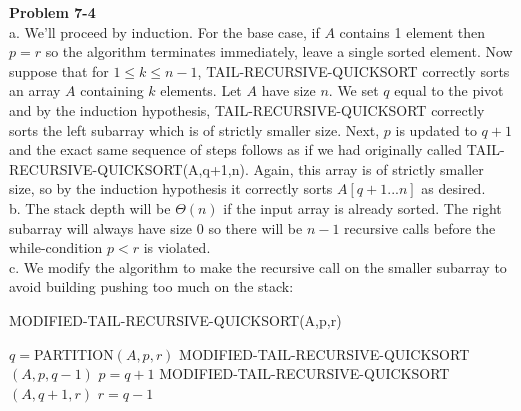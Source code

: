 \documentclass{article}
\begin{document}
\noindent\textbf{Problem 7-4}\\

a. We'll proceed by induction.  For the base case, if $A$ contains 1 element then $p = r$ so the algorithm terminates immediately, leave a single sorted element.  Now suppose that for $1 \leq k \leq n-1$, TAIL-RECURSIVE-QUICKSORT correctly sorts an array $A$ containing $k$ elements. Let $A$ have size $n$.  We set $q$ equal to the pivot and by the induction hypothesis, TAIL-RECURSIVE-QUICKSORT correctly sorts the left subarray which is of strictly smaller size.  Next, $p$ is updated to $q+1$ and the exact same sequence of steps follows as if we had originally called TAIL-RECURSIVE-QUICKSORT(A,q+1,n).  Again, this array is of strictly smaller size, so by the induction hypothesis it correctly sorts $A[q+1...n]$ as desired. \\

b. The stack depth will be $\Theta(n)$ if the input array is already sorted. The right subarray will always have size 0 so there will be $n-1$ recursive calls before the while-condition $p<r$ is violated. \\

c. We modify the algorithm to make the recursive call on the smaller subarray to avoid building pushing too much on the stack:

\begin{algorithm}
\caption{MODIFIED-TAIL-RECURSIVE-QUICKSORT(A,p,r)}
\begin{algorithmic}[1]
	\State $q = $PARTITION$(A,p,r)$
		\State MODIFIED-TAIL-RECURSIVE-QUICKSORT$(A,p,q-1)$
		\State $p = q+1$
	\Else
		\State MODIFIED-TAIL-RECURSIVE-QUICKSORT$(A,q+1,r)$
		\State $r = q-1$
	\EndIf
\EndWhile
\end{algorithmic}
\end{algorithm}
\end{document}
